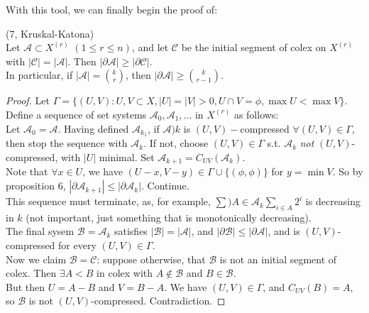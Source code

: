 \documentclass[a4paper]{article}
\begin{document}
With this tool, we can finally begin the proof of:
\begin{thm} (7, Kruskal-Katona)\\
    Let $\mathcal{A} \subset X^{(r)}$ $(1 \leq r \leq n)$, and let $\mathcal{C}$ be the initial segment of colex on $X^{(r)}$ with $|\mathcal{C}| = |\mathcal{A}|$. Then $|\partial \mathcal{A}| \geq |\partial \mathcal{C}|$.\\
    In particular, if $|\mathcal{A}| = {k \choose r}$, then $|\partial \mathcal{A}| \geq {k \choose {r-1}}$.
    \begin{proof}
        Let $\Gamma = \{(U,V): U,V \subset X, |U| = |V| > 0, U \cap V = \phi, \max U < \max V\}$.\\
        Define a sequence of set systems $\mathcal{A}_0,\mathcal{A}_1,...$ in $X^{(r)}$ as follows:\\
        Let $\mathcal{A}_0 = \mathcal{A}$. Having defined $\mathcal{A}_{k_1}$, if $\mathcal{A})k$ is $(U,V)-$compressed $\forall (U,V) \in \Gamma$, then stop the sequence with $\mathcal{A}_k$. If not, choose $(U,V) \in \Gamma$ s.t. $\mathcal{A}_k$ \emph{not} $(U,V)$-compressed, with $|U|$ minimal. Set $\mathcal{A}_{k+1} = C_{UV}(\mathcal{A}_k)$.\\
        Note that $\forall x \in U$, we have $(U-x,V-y) \in \Gamma \cup \{(\phi,\phi)\}$ for $y = \min V$. So by proposition 6, $|\partial \mathcal{A}_{k+1}| \leq |\partial \mathcal{A}_k|$. Continue.\\
        This sequence must terminate, as, for example, $\sum){A \in \mathcal{A}_k} \sum_{i \in A} 2^i$ is decreasing in $k$ (not important, just something that is monotonically decreasing).\\
        The final sysem $\mathcal{B} = \mathcal{A}_k$ satisfies $|\mathcal{B}| = |\mathcal{A}|$, and $|\partial \mathcal{B}| \leq |\partial \mathcal{A}|$, and is $(U,V)$-compressed for every $(U,V) \in \Gamma$.\\
        Now we claim $\mathcal{B} = \mathcal{C}$: suppose otherwise, that $\mathcal{B}$ is not an initial segment of colex. Then $\exists A < B$ in colex with $A \not\in \mathcal{B}$ and $B \in \mathcal{B}$.\\
        But then $U = A-B$ and $V=B-A$. We have $(U,V) \in \Gamma$, and $C_{UV}(B) = A$, so $\mathcal{B}$ is not $(U,V)$-compressed. Contradiction.
    \end{proof}
\end{thm}
\end{document}
